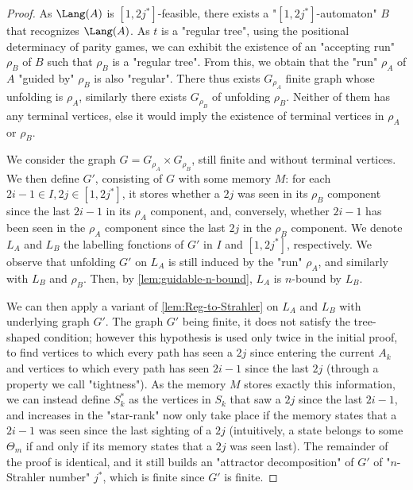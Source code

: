 \documentclass[a4paper,UKenglish,cleveref, autoref, thm-restate]{lipics-v2021}
\begin{document}
\begin{proof}
	As $\Lang(A)$ is $[1,2j^*]$-feasible, there exists a "$[1,2j^*]$-automaton" $B$ that recognizes $\Lang(A)$. As $t$ is a "regular tree", using the positional determinacy of parity games, we can exhibit the existence of an "accepting run" $\rho_B$  of $B$ such that $\rho_B$ is a "regular tree". From this, we obtain that the "run" $\rho_A$ of $A$ "guided by" $\rho_B$ is also "regular". There thus exists $G_{\rho_A}$ finite graph whose unfolding is $\rho_A$, similarly there exists $G_{\rho_B}$ of unfolding $\rho_B$. Neither of  them has any terminal vertices, else it would imply the existence of terminal vertices in $\rho_A$ or $\rho_B$.
	
	We consider the graph $G = G_{\rho_A} \times G_{\rho_B}$, still finite and without terminal vertices. We then define $G'$, consisting of $G$ with some memory $M$: for each $2i-1\in I, 2j \in [1,2j^*]$, it stores whether a $2j$ was seen in its $\rho_B$ component since the last $2i-1$ in its $\rho_A$ component, and, conversely, whether $2i-1$ has been seen in the $\rho_A$ component since the last $2j$ in the $\rho_B$ component. We denote $L_A$ and $L_B$ the labelling fonctions of $G'$ in $I$ and $[1,2j^*]$, respectively. We observe that unfolding $G'$ on $L_A$ is still induced by the "run" $\rho_A$, and similarly with $L_B$ and $\rho_B$. Then, by \cref{lem:guidable-n-bound}, $L_A$ is $n$-bound by $L_B$.
	
	We can then apply a variant of \cref{lem:Reg-to-Strahler} on $L_A$ and $L_B$ with underlying graph $G'$. The graph $G'$ being finite, it does not satisfy the tree-shaped condition; however this hypothesis is used only twice in the initial proof, to find vertices to which every path has seen a $2j$ since entering the current $A_k$ and vertices to which every path has seen $2i-1$ since the last $2j$ (through a property we call "tightness"). As the memory $M$ stores exactly this information, we can instead define $S^*_k$ as the vertices in $S_k$ that saw a $2j$ since the last $2i-1$, and increases in the "star-rank" now only take place if the memory states that a $2i-1$ was seen since the last sighting of a $2j$ (intuitively, a state belongs to some $\Theta_m$ if and only if its memory states that a $2j$ was seen last). The remainder of the proof is identical, and it still builds an "attractor decomposition" of $G'$ of "$n$-Strahler number" $j^*$, which is finite since $G'$ is finite.\qedhere
	
\end{proof}
\end{document}
